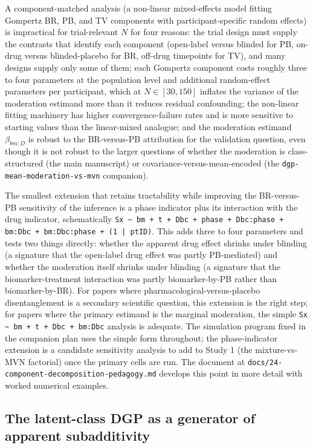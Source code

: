\documentclass[
  11pt,
]{article}
\begin{document}
A component-matched analysis (a non-linear mixed-effects model fitting
Gompertz BR, PB, and TV components with participant-specific random
effects) is impractical for trial-relevant \(N\) for four reasons: the
trial design must supply the contrasts that identify each component
(open-label versus blinded for PB, on-drug versus blinded-placebo for
BR, off-drug timepoints for TV), and many designs supply only some of
them; each Gompertz component costs roughly three to four parameters at
the population level and additional random-effect parameters per
participant, which at \(N \in [30, 150]\) inflates the variance of the
moderation estimand more than it reduces residual confounding; the
non-linear fitting machinery has higher convergence-failure rates and
is more sensitive to starting values than the linear-mixed analogue;
and the moderation estimand \(\beta_{bm:D}\) is robust to the
BR-versus-PB attribution for the validation question, even though it is
not robust to the larger questions of whether the moderation is
class-structured (the main manuscript) or covariance-versus-mean-encoded
(the \texttt{dgp-mean-moderation-vs-mvn} companion).

The smallest extension that retains tractability while improving the
BR-versus-PB sensitivity of the inference is a phase indicator plus its
interaction with the drug indicator, schematically
\texttt{Sx \textasciitilde{} bm + t + Dbc + phase + Dbc:phase + bm:Dbc + bm:Dbc:phase + (1 | ptID)}.
This adds three to four parameters and tests two things directly:
whether the apparent drug effect shrinks under blinding (a signature
that the open-label drug effect was partly PB-mediated) and whether
the moderation itself shrinks under blinding (a signature that the
biomarker-treatment interaction was partly biomarker-by-PB rather
than biomarker-by-BR). For papers where pharmacological-versus-placebo
disentanglement is a secondary scientific question, this extension is
the right step; for papers where the primary estimand is the marginal
moderation, the simple \texttt{Sx \textasciitilde{} bm + t + Dbc + bm:Dbc}
analysis is adequate. The simulation program fixed in the companion
plan uses the simple form throughout; the phase-indicator extension is
a candidate sensitivity analysis to add to Study 1 (the mixture-vs-MVN
factorial) once the primary cells are run. The document at
\texttt{docs/24-component-decomposition-pedagogy.md} develops this
point in more detail with worked numerical examples.

\subsection{The latent-class DGP as a generator of apparent subadditivity}\label{the-latent-class-dgp-as-a-generator-of-apparent-subadditivity}
\end{document}
